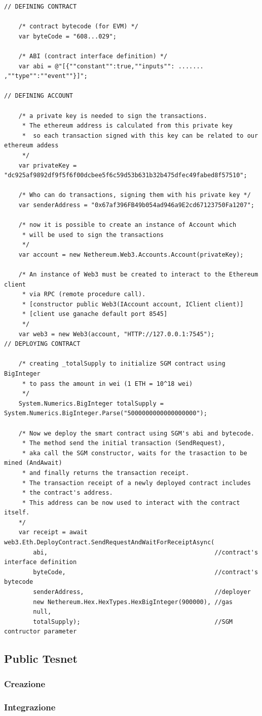 \documentclass[11pt]{thesistemp}
\begin{document}
\begin{lstlisting}
// DEFINING CONTRACT

    /* contract bytecode (for EVM) */
    var byteCode = "608...029";

    /* ABI (contract interface definition) */
    var abi = @"[{""constant"":true,""inputs"": ....... ,""type"":""event""}]";

// DEFINING ACCOUNT

    /* a private key is needed to sign the transactions.
     * The ethereum address is calculated from this private key 
     *  so each transaction signed with this key can be related to our ethereum addess
     */
    var privateKey = "dc925af9892df9f5f6f00dcbee5f6c59d53b631b32b475dfec49fabed8f57510";

    /* Who can do transactions, signing them with his private key */
    var senderAddress = "0x67af396FB49b054ad946a9E2cd67123750Fa1207";

    /* now it is possible to create an instance of Account which 
     * will be used to sign the transactions
     */
    var account = new Nethereum.Web3.Accounts.Account(privateKey);

    /* An instance of Web3 must be created to interact to the Ethereum client 
     * via RPC (remote procedure call).
     * [constructor public Web3(IAccount account, IClient client)] 
     * [client use ganache default port 8545] 
     */
    var web3 = new Web3(account, "HTTP://127.0.0.1:7545");
// DEPLOYING CONTRACT

    /* creating _totalSupply to initialize SGM contract using BigInteger 
     * to pass the amount in wei (1 ETH = 10^18 wei)
     */
    System.Numerics.BigInteger totalSupply = System.Numerics.BigInteger.Parse("5000000000000000000");

    /* Now we deploy the smart contract using SGM's abi and bytecode.
     * The method send the initial transaction (SendRequest), 
     * aka call the SGM constructor, waits for the trasaction to be mined (AndAwait)
     * and finally returns the transaction receipt.
     * The transaction receipt of a newly deployed contract includes
     * the contract's address.
     * This address can be now used to interact with the contract itself. 
    */
    var receipt = await web3.Eth.DeployContract.SendRequestAndWaitForReceiptAsync(
        abi,                                              //contract's interface definition
        byteCode,                                         //contract's  bytecode
        senderAddress,                                    //deployer
        new Nethereum.Hex.HexTypes.HexBigInteger(900000), //gas
        null,
        totalSupply);                                     //SGM contructor parameter

\end{lstlisting}

\subsection{Public Tesnet}
\subsubsection{Creazione}
\subsubsection{Integrazione}



\end{document}
